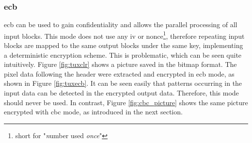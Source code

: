 \subsubsection{\gls{ecb}}\label{deterministicEnc}

\gls{ecb} can be used to gain confidentiality and allows the parallel processing of all input blocks. This mode does not use any \gls{iv} or nonce\footnote{short for "\textit{n}umber used \textit{once}"},
therefore repeating input blocks are mapped to the same output blocks under the same key, implementing a deterministic encryption scheme.
This is problematic, which can be seen quite intuitively. 
Figure \ref{fig:tuxclr} shows a picture saved in the bitmap format. The pixel data following the header were extracted and encrypted in \gls{ecb} mode, as shown in
Figure \ref{fig:tuxecb}. It can be seen easily that patterns occurring in the input data can be detected in the encrypted output data. Therefore, this mode should never be used. In 
contrast, Figure \ref{fig:cbc_picture} shows the same picture encrypted with \gls{cbc} mode, as introduced in the next section.	
\\
